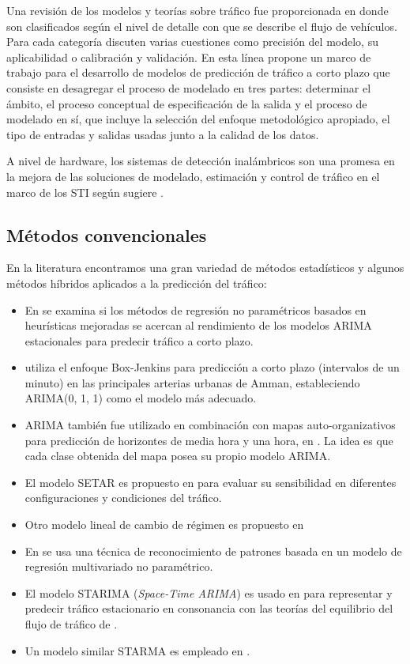 \documentclass{llncs}
\begin{document}
Una revisión de los modelos y teorías sobre tráfico fue proporcionada en \cite{Hoogendoorn2001283} donde son clasificados según el nivel de detalle con que se describe el flujo de vehículos. Para cada categoría discuten varias cuestiones como precisión del modelo, su aplicabilidad o calibración y validación.  En esta línea \cite{Vlahogianni2004533} propone un marco de trabajo para el desarrollo de modelos de predicción de tráfico a corto plazo que consiste en desagregar el proceso de modelado en tres partes: determinar el ámbito, el proceso conceptual de especificación de la salida y el proceso de modelado en sí, que incluye la selección del enfoque metodológico apropiado, el tipo de entradas y salidas usadas junto a la calidad de los datos.

A nivel de hardware, los sistemas de detección inalámbricos son una promesa en la mejora de las soluciones de modelado, estimación y control de tráfico en el marco de los STI según sugiere \cite{tubaishat2009wireless}.



\subsection{Métodos convencionales}
En la literatura encontramos una gran variedad de métodos estadísticos y algunos métodos híbridos aplicados a la predicción del tráfico:
\begin{itemize}
\item En \cite{smith2002comparison} se examina si los métodos de regresión no paramétricos basados en heurísticas mejoradas se acercan al rendimiento de los modelos ARIMA estacionales para predecir tráfico a corto plazo.
\item \cite{hamed1995short} utiliza el enfoque Box-Jenkins para predicción a corto plazo (intervalos de un minuto) en las principales arterias urbanas de Amman, estableciendo ARIMA(0, 1, 1) como el modelo más adecuado.
\item ARIMA también fue utilizado en combinación con mapas auto-organizativos para predicción de horizontes de media hora y una hora, en \cite{van1996combining}. La idea es que cada clase obtenida del mapa posea su propio modelo ARIMA. 
\item El modelo SETAR es propuesto en \cite{ishak2002performance} para evaluar su sensibilidad en diferentes configuraciones y condiciones del tráfico.
\item Otro modelo lineal de cambio de régimen es propuesto en \cite{zhang2003short} 
\item En \cite{clark2003traffic} se usa una técnica de reconocimiento de patrones basada en un modelo de regresión multivariado no paramétrico.
\item El modelo STARIMA (\emph{Space-Time ARIMA}) es usado en \cite{kamarianakis2005space} para representar y predecir tráfico estacionario en consonancia con las teorías del equilibrio del flujo de tráfico de \cite{wardrop1952correspondence}. 
\item Un modelo similar STARMA es empleado en \cite{min2011real}.
\end{itemize}
\end{document}

